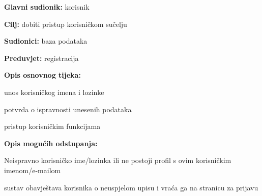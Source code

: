                     \noindent {}
					\begin{packed_item}
	
						\item \textbf{Glavni sudionik: }korisnik
						\item  \textbf{Cilj: }dobiti pristup korisničkom sučelju
						\item  \textbf{Sudionici: }baza podataka
						\item  \textbf{Preduvjet: }registracija
						\item  \textbf{Opis osnovnog tijeka:}
						
						\item[] \begin{packed_enum}
	
							\item unos korisničkog imena i lozinke
							\item potvrda o ispravnosti unesenih podataka
							\item pristup korisničkim funkcijama

						\end{packed_enum}
						
						\item  \textbf{Opis mogućih odstupanja:}
						
						\item[] \begin{packed_item}
	
							\item[2.a] Neispravno korisničko ime/lozinka ili ne postoji profil s ovim korisničkim imenom/e-mailom
							\item[] \begin{packed_enum}
								
								\item sustav obavještava korisnika o neuspjelom upisu i vraća ga na stranicu za prijavu
								
							\end{packed_enum}
							
						\end{packed_item}
					\end{packed_item}

